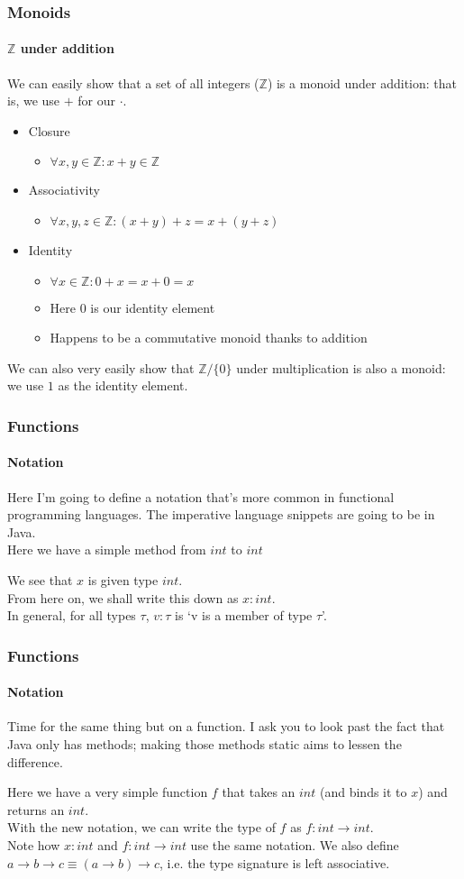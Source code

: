 \documentclass{beamer}
\begin{document}
\begin{frame}
  \frametitle{Monoids}
  \framesubtitle{$\mathbb{Z}$ under addition}
  We can easily show that a set of all integers ($\mathbb{Z}$) is a monoid
  under addition: that is, we use $+$ for our $\cdot$.
  \pause
  \begin{itemize}[<+->]
    \item Closure
      \begin{itemize}
        \item $\forall x,y \in \mathbb{Z} : x + y \in \mathbb{Z}$
      \end{itemize}
    \item Associativity
      \begin{itemize}
        \item $\forall x,y,z \in \mathbb{Z} : (x + y) + z = x + (y + z)$
      \end{itemize}
    \item Identity
      \begin{itemize}
        \item $\forall x \in \mathbb{Z} : 0 + x = x + 0 = x$
        \item Here $0$ is our identity element
        \item Happens to be a commutative monoid thanks to addition
      \end{itemize}
  \end{itemize}
  \pause
  We can also very easily show that $\mathbb{Z} / \{0\}$ under multiplication is
  also a monoid: we use $1$ as the identity element.
\end{frame}
\begin{frame}
  \frametitle{Functions}
  \framesubtitle{Notation}
  Here I'm going to define a notation that's more common in functional
  programming languages. The imperative language snippets are going to
  be in Java.\\
  Here we have a simple method from $int$ to $int$
  \pause
  
  \pause
  We see that $x$ is given type $int$.\\
  From here on, we shall write this down as $x:int$.\\
  \pause
  In general, for all types $\tau$, $v:\tau$ is `v is a member of type $\tau$'.
\end{frame}
\begin{frame}
  \frametitle{Functions}
  \framesubtitle{Notation}
  Time for the same thing but on a function. I ask you to look past
  the fact that Java only has methods; making those methods static
  aims to lessen the difference.
  \pause
  
  \pause
  Here we have a very simple function $f$ that takes an $int$ (and binds it to
  $x$) and returns an $int$.\\
  \pause
  With the new notation, we can write the type of $f$ as $f:int
  \rightarrow int$.\\
  \pause
  Note how $x:int$ and $f:int \rightarrow int$ use the same notation.
  \pause
  We also define $a \rightarrow b \rightarrow c \equiv (a
  \rightarrow b) \rightarrow c$, i.e. the type signature is left associative.
\end{frame}
\end{document}
